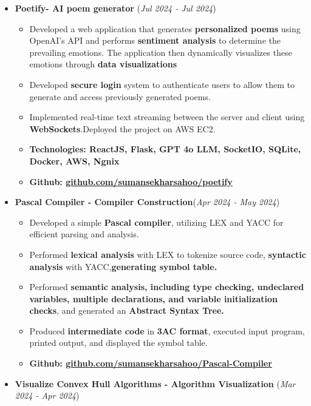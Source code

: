 \documentclass[10pt]{extarticle}
\begin{document}
\begin{itemize}
\item \textbf{Poetify- AI poem generator} \hfill\hfill(\textit{Jul 2024 - Jul 2024})\
\begin{itemize}
\item Developed a web application that generates \textbf{personalized poems} using OpenAI's API and performs \textbf{sentiment analysis} to determine the prevailing emotions. The application then dynamically visualizes these emotions through \textbf{data visualizations}
\item Developed \textbf{secure login} system to authenticate users to allow them to generate and access previously generated poems.
\item Implemented real-time text streaming between the server and client using \textbf{WebSockets}.Deployed the project on AWS EC2.
\item \textbf{Technologies: ReactJS, Flask, GPT 4o LLM, SocketIO, SQLite, Docker, AWS, Ngnix} 
\item \textbf{Github: \href{https://github.com/sumansekharsahoo/poetify}{github.com/sumansekharsahoo/poetify}}
\end{itemize}
\vspace{2mm}
\item \textbf{Pascal Compiler - Compiler Construction}\hfill\hfill(\textit{Apr 2024 - May 2024})\
\begin{itemize}
\item Developed a simple \textbf{Pascal compiler}, utilizing LEX and YACC for efficient parsing and analysis.
\item Performed \textbf{lexical analysis} with LEX to tokenize source code, \textbf{syntactic analysis} with YACC,\textbf{generating symbol table.}
\item Performed \textbf{semantic analysis, including type checking, undeclared variables, multiple declarations, and variable initialization checks}, and generated an \textbf{Abstract Syntax Tree.}
\item Produced \textbf{intermediate code} in \textbf{3AC format}, executed input program, printed output, and displayed the symbol table.
\item \textbf{Github: \href{https://github.com/sumansekharsahoo/Pascal-Compiler}{github.com/sumansekharsahoo/Pascal-Compiler}}
\end{itemize}
\vspace{2mm}
\item \textbf{Visualize Convex Hull Algorithms - Algorithm Visualization} \hfill\hfill(\textit{Mar 2024 - Apr 2024})\

\end{itemize}
\end{document}
